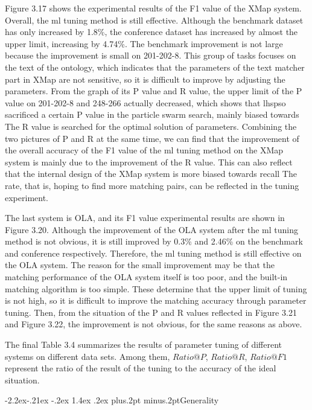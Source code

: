 \documentclass[twoside]{article}
\makeatletter
\def\subsubsection{\@startsection{subsubsection}{3}{\z@}%
 {-2.2ex\@plus -.21ex \@minus -.2ex}%
 {1.4ex \@plus.2ex}
{\normalfont\normalsize\protect\baselineskip=12pt plus.2pt minus.2pt\sl}}
\makeatother
\begin{document}
Figure 3.17 shows the experimental results of the F1 value of the XMap system.
Overall, the ml tuning method is still effective. Although the benchmark dataset has only increased by 1.8\%, the conference dataset has increased by almost the upper limit, increasing by 4.74\%.
The benchmark improvement is not large because the improvement is small on 201-202-8. This group of tasks focuses on the text of the ontology, which indicates that the parameters of the text matcher part in XMap are not sensitive, so it is difficult to improve by adjusting the parameters.
From the graph of its P value and R value, the upper limit of the P value on 201-202-8 and 248-266 actually decreased, which shows that lhspso sacrificed a certain P value in the particle swarm search, mainly biased towards The R value is searched for the optimal solution of parameters.
Combining the two pictures of P and R at the same time, we can find that the improvement of the overall accuracy of the F1 value of the ml tuning method on the XMap system is mainly due to the improvement of the R value. This can also reflect that the internal design of the XMap system is more biased towards recall The rate, that is, hoping to find more matching pairs, can be reflected in the tuning experiment.

The last system is OLA, and its F1 value experimental results are shown in Figure 3.20.
Although the improvement of the OLA system after the ml tuning method is not obvious, it is still improved by 0.3\% and 2.46\% on the benchmark and conference respectively. Therefore, the ml tuning method is still effective on the OLA system.
The reason for the small improvement may be that the matching performance of the OLA system itself is too poor, and the built-in matching algorithm is too simple. These determine that the upper limit of tuning is not high, so it is difficult to improve the matching accuracy through parameter tuning.
Then, from the situation of the P and R values reflected in Figure 3.21 and Figure 3.22, the improvement is not obvious, for the same reasons as above.

The final Table 3.4 summarizes the results of parameter tuning of different systems on different data sets. Among them, $Ratio@P$, $Ratio@R$, $Ratio@F1$ represent the ratio of the result of the tuning to the accuracy of the ideal situation.

\subsubsection{Generality}
\end{document}
